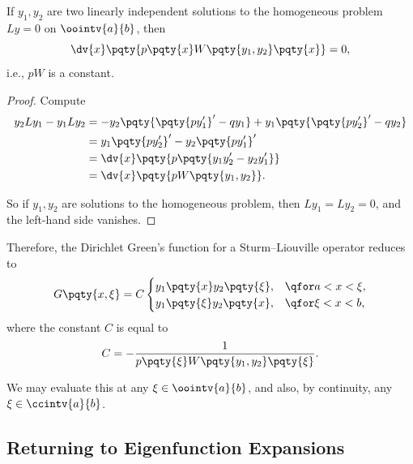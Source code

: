 \begin{proposition}
    If \(y_1, y_2\) are two linearly independent solutions to the homogeneous problem \(Ly = 0\) on \(\oointv{a}{b}\), then
    \begin{equation}
        \dv{x} \pqty{p \pqty{x} W\pqty{y_1, y_2} \pqty{x}} = 0,
    \end{equation}
    i.e., \(pW\) is a constant.
\end{proposition}

\begin{proof}
    Compute
    \begin{subequations}
        \begin{align}
            y_2 L y_1 - y_1 L y_2 &= - y_2 \pqty{\pqty{p y_1'}' - q y_1} + y_1 \pqty{\pqty{p y_2'}' - q y_2} \\
            &= y_1 \pqty{p y_2'}' - y_2 \pqty{p y_1'}' \\
            &= \dv{x} \pqty{p \pqty{y_1 y_2' - y_2 y_1'}} \\
            &= \dv{x} \pqty{p W\pqty{y_1, y_2}}.
        \end{align}
    \end{subequations}

    So if \(y_1, y_2\) are solutions to the homogeneous problem, then \(Ly_1 = Ly_2 = 0\), and the left-hand side vanishes.
\end{proof}

Therefore, the Dirichlet Green's function for a Sturm--Liouville operator reduces to
\begin{equation}
    G\pqty{x, \xi} = C \begin{cases}
        y_1\pqty{x} y_2\pqty{\xi}, & \qfor a < x < \xi, \\
        y_1\pqty{\xi} y_2\pqty{x}, & \qfor \xi < x < b,
    \end{cases}
\end{equation}
where the constant \(C\) is equal to
\begin{equation}
    C = - \frac{1}{p\pqty{\xi} W\pqty{y_1, y_2} \pqty{\xi}}.
\end{equation}

We may evaluate this at any \(\xi \in \oointv{a}{b}\), and also, by continuity, any \(\xi \in \ccintv{a}{b}\).

\subsection{Returning to Eigenfunction Expansions}

